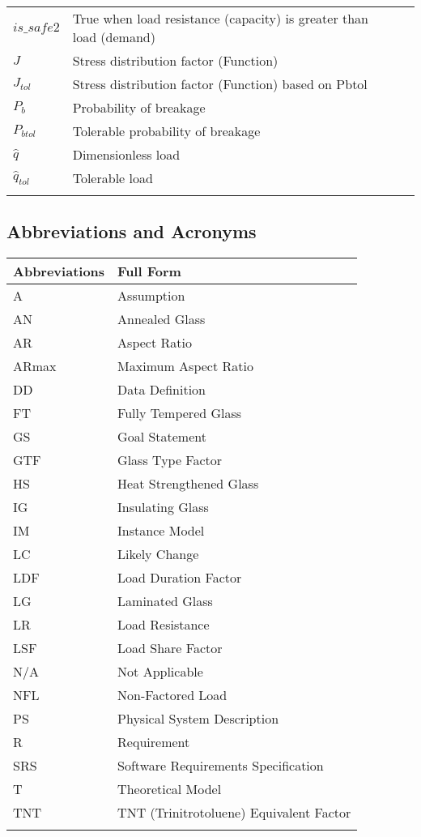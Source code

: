 \documentclass[12pt]{article}
\begin{document}
\begin{longtable*}{l l l}
\\
$is\_safe2$ & True when load resistance (capacity) is greater than load (demand) & 
\\
$J$ & Stress distribution factor (Function) & 
\\
$J_{tol}$ & Stress distribution factor (Function) based on Pbtol & 
\\
$P_{b}$ & Probability of breakage & 
\\
$P_{btol}$ & Tolerable probability of breakage & 
\\
$\hat{q}$ & Dimensionless load & 
\\
$\hat{q}_{tol}$ & Tolerable load & 
\\
\bottomrule
\label{Table:ToS}
\end{longtable*}
\subsection{Abbreviations and Acronyms}
\label{Sec:AaA}
\begin{longtable*}{l l}
\toprule
Abbreviations & Full Form
\\
\midrule
A & Assumption
\\
AN & Annealed Glass
\\
AR & Aspect Ratio
\\
ARmax & Maximum Aspect Ratio
\\
DD & Data Definition
\\
FT & Fully Tempered Glass
\\
GS & Goal Statement
\\
GTF & Glass Type Factor
\\
HS & Heat Strengthened Glass
\\
IG & Insulating Glass
\\
IM & Instance Model
\\
LC & Likely Change
\\
LDF & Load Duration Factor
\\
LG & Laminated Glass
\\
LR & Load Resistance
\\
LSF & Load Share Factor
\\
N/A & Not Applicable
\\
NFL & Non-Factored Load
\\
PS & Physical System Description
\\
R & Requirement
\\
SRS & Software Requirements Specification
\\
T & Theoretical Model
\\
TNT & TNT (Trinitrotoluene) Equivalent Factor
\\
\bottomrule
\label{Table:AaA}
\end{longtable*}
\end{document}
